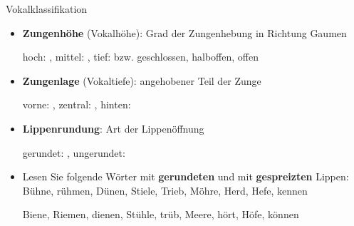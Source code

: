 \begin{frame}{Vokalklassifikation}

	\begin{itemize}
		\item \textbf{Zungenhöhe} (Vokalhöhe): Grad der Zungenhebung in Richtung Gaumen

		\ea hoch: \textipa{[ i: ]}, mittel: \textipa{[ o: ]}, tief: \textipa{[ a: ]} bzw. geschlossen, halboffen, offen
		\z

\pause 

		\item \textbf{Zungenlage} (Vokaltiefe): angehobener Teil der Zunge

		\ea vorne: \textipa{[ i: ]}, zentral: \textipa{[ a: ]}, hinten: \textipa{[ u: ]}
		\z

\pause 

		\item \textbf{Lippenrundung}: Art der Lippenöffnung

		\ea gerundet: \textipa{[ o: ]}, ungerundet: \textipa{[ i: ]}
		\z

		\bigskip
 

 	\item Lesen Sie folgende Wörter mit \textbf{gerundeten} und mit \textbf{gespreizten} Lippen:
	\ea 
	\ea Bühne, rühmen, Dünen, Stiele, Trieb, Möhre, Herd, Hefe, kennen

\pause 	

	\ex  Biene, Riemen, dienen, Stühle, trüb, Meere, hört, Höfe, können
	\z  
	\z 
 
\end{itemize}

\end{frame}


